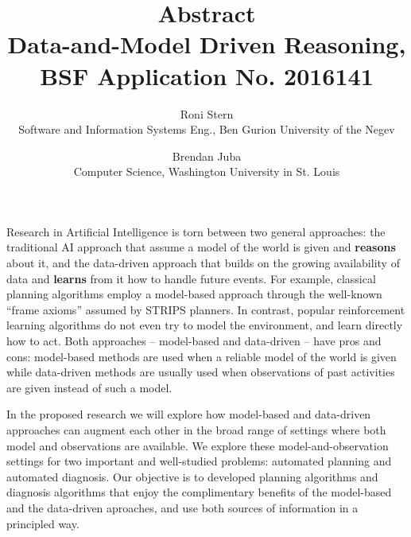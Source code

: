 \documentclass[12pt]{article}
\begin{document}
\title{Abstract \\ \Large{Data-and-Model Driven Reasoning, BSF Application No. 2016141}}
\date{\vspace{-0.5cm}}
\author{Roni Stern \\ Software and Information Systems Eng., Ben Gurion University of the Negev
        \and Brendan Juba \\ Computer Science, Washington University in St. Louis}
\maketitle

Research in Artificial Intelligence is torn between two general approaches: the traditional AI approach that assume a model of the world is given and {\bf reasons} about it, and the data-driven  approach that builds on the growing availability of data and {\bf learns} from it how to handle future events. For example, classical planning algorithms 
employ a model-based approach through the well-known ``frame axioms'' assumed by STRIPS planners. In contrast, popular reinforcement learning algorithms do not even try to model the environment, and learn directly how to act. Both approaches -- model-based and data-driven -- have pros and cons: model-based methods are used when a reliable model of the world is given while 
data-driven methods are usually used when observations of past activities are given instead of such a model. %





In the proposed research we will explore how model-based and data-driven approaches can augment each other in the broad range of settings where both model and observations are available. We explore these model-and-observation settings for two important and well-studied problems: automated planning and automated diagnosis. 
Our objective is to developed planning algorithms and diagnosis algorithms that enjoy the complimentary benefits of the model-based and the data-driven aproaches, and use both sources of information in a principled way. 
\end{document}
